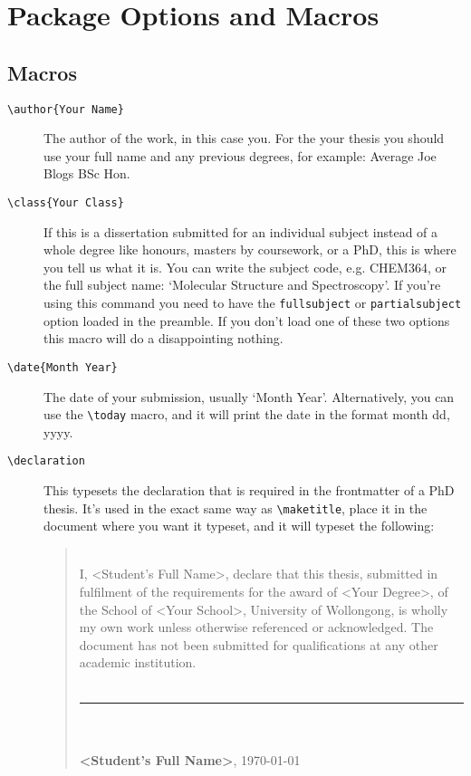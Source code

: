 \documentclass[12pt,oneside]{article}
\newcommand{\oporcom}[1]{\texttt{\color{RoyalBlue}#1}} %
\newcommand{\comoptions}[1]{\texttt{\color{Gray}#1}} %
\begin{document}
\section{Package Options and Macros}
\subsection*{Macros}
\begin{description}
    \item[\oporcom{\textbackslash{}author}\comoptions{\{Your Name\}}]
    The author of the work, in this case you. For the your thesis you should use your full name and any previous degrees, for example: Average Joe Blogs BSc Hon.
    
    \item[\oporcom{\textbackslash{}class}\comoptions{\{Your Class\}}] If this is a dissertation submitted for an individual subject instead of a whole degree like honours, masters by coursework, or a PhD, this is where you tell us what it is. You can write the subject code, e.g. CHEM364, or the full subject name: `Molecular Structure and Spectroscopy'. If you're using this command you need to have the \oporcom{fullsubject} or \oporcom{partialsubject} option loaded in the preamble. If you don't load one of these two options this macro will do a disappointing nothing.
    
    \item[\oporcom{\textbackslash{}date}\comoptions{\{Month Year\}}] The date of your submission, usually `Month Year'. Alternatively, you can use the \oporcom{\textbackslash{}today} macro, and it will print the date in the format month dd, yyyy.
    
    \item[\oporcom{\textbackslash{}declaration}] This typesets the declaration that is required in the frontmatter of a PhD thesis. It's used in the exact same way as \oporcom{\textbackslash{}maketitle}, place it in the document where you want it typeset, and it will typeset the following:
\begin{quote}
    \\

    \noindent I, \textless{}Student's Full Name\textgreater, declare that this thesis, submitted in fulfilment of the requirements for the award of \textless{}Your Degree\textgreater, of the School of \textless{}Your School\textgreater, University of Wollongong, is wholly my own work unless otherwise referenced or acknowledged. The document has not been submitted for qualifications at any other academic institution.\\
    \vspace{16mm}\\
    \noindent\rule{0.4\textwidth}{1pt}\\
    \vspace{8mm}\\
    \textbf{\textless{}Student's Full Name\textgreater}, \today\\
\end{quote}
    

\end{description}
\end{document}
